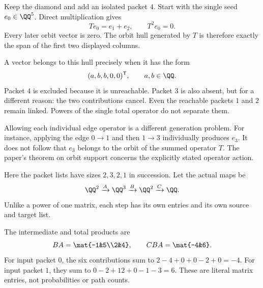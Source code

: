 Keep the diamond and add an isolated packet $4$. Start with the single seed $e_0\in\QQ^5$. Direct multiplication gives
\[
Te_0=e_1+e_2,\qquad T^2e_0=0.
\]
Every later orbit vector is zero. The orbit hull generated by $T$ is therefore exactly the span of the first two displayed columns.


A vector belongs to this hull precisely when it has the form
\[
(a,b,b,0,0)^\mathsf T,\qquad a,b\in\QQ.
\]
Packet $4$ is excluded because it is unreachable. Packet $3$ is also absent, but for a different reason: the two contributions cancel. Even the reachable packets $1$ and $2$ remain linked. Powers of the single total operator do not separate them.

Allowing each individual edge operator is a different generation problem. For instance, applying the edge $0\to1$ and then $1\to3$ individually produces $e_3$. It does not follow that $e_3$ belongs to the orbit of the summed operator $T$. The paper's theorem on orbit support concerns the explicitly stated operator action.


Here the packet lists have sizes $2,3,2,1$ in succession. Let the actual maps be
\[
\QQ^2\xrightarrow{A}\QQ^3\xrightarrow{B}\QQ^2\xrightarrow{C}\QQ.
\]
Unlike a power of one matrix, each step has its own entries and its own source and target list.


The intermediate and total products are
\[
BA=\mat{-1&5\\2&4},\qquad CBA=\mat{-4&6}.
\]
For input packet $0$, the six contributions sum to $2-4+0+0-2+0=-4$. For input packet $1$, they sum to $0-2+12+0-1-3=6$. These are literal matrix entries, not probabilities or path counts.

